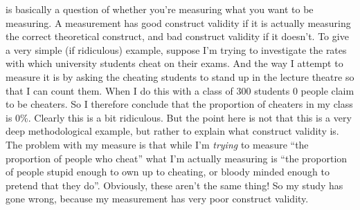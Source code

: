 
 is basically a question of whether you're measuring what you want to be measuring.  A measurement has good construct validity if it is actually measuring the correct theoretical construct, and bad construct validity if it doesn't.  To give a very simple (if ridiculous) example, suppose I'm trying to investigate the rates with which university students cheat on their exams. And the way I attempt to measure it is by asking the cheating students to stand up in the lecture theatre so that I can count them. When I do this with a class of 300 students 0 people claim to be cheaters. So I therefore conclude that the proportion of cheaters in my class is 0\%. Clearly this is a bit ridiculous. But the point here is not that this is a very deep methodological example, but rather to explain what construct validity is. The problem with my measure is that while I'm {\it trying} to measure ``the proportion of people who cheat'' what I'm actually measuring is ``the proportion of people stupid enough to own up to cheating, or bloody minded enough to pretend that they do''. Obviously, these aren't the same thing! So my study has gone wrong, because my measurement has very poor construct validity.


